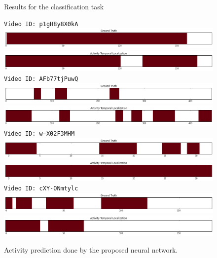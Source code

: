 \begin{figure}[H]
\begin{center}
\end{center}
\caption{Results for the classification task}
\label{fig:results_visualization_classification}
\end{figure}

\begin{figure}[H]
\begin{center}
\texttt{Video ID: p1gH8y8X0kA}
\includegraphics[width=1\linewidth]{img/results/results_visualization_detection_a_1}
\includegraphics[width=1\linewidth]{img/results/results_visualization_detection_a_2}
\texttt{Video ID: AFb77tjPuwQ}
\includegraphics[width=1\linewidth]{img/results/results_visualization_detection_b_1}
\includegraphics[width=1\linewidth]{img/results/results_visualization_detection_b_2}
\texttt{Video ID: w--X02F3MHM}
\includegraphics[width=1\linewidth]{img/results/results_visualization_detection_c_1}
\includegraphics[width=1\linewidth]{img/results/results_visualization_detection_c_2}
\texttt{Video ID: cXY-ONmtylc}
\includegraphics[width=1\linewidth]{img/results/results_visualization_detection_d_1}
\includegraphics[width=1\linewidth]{img/results/results_visualization_detection_d_2}
\end{center}
\caption{Activity prediction done by the proposed neural network.}
\label{fig:results_visualization_detection}
\end{figure}

